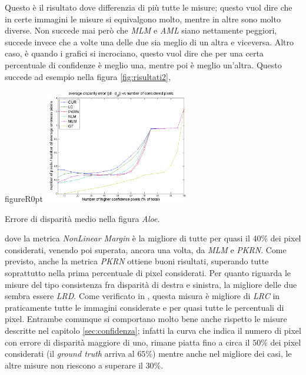 \documentclass[12pt]{report}
\begin{document}
			\noindent Questo è il risultato dove differenzia di più tutte le misure; questo vuol dire che in certe immagini le misure si equivalgono molto, mentre in altre sono molto diverse. Non succede mai però che \textit{MLM} e \textit{AML} siano nettamente peggiori, succede invece che a volte una delle due sia meglio di un altra e viceversa. Altro caso, è quando i grafici si incrociano, questo vuol dire che per una certa percentuale di confidenze è meglio una, mentre poi è meglio un'altra. Questo succede ad esempio nella figura \ref{fig:risultati2},
			\newpage
			
			\begin{wrapfloat}{figure}{R}{0pt}
				\includegraphics[width=0.48\textwidth]{./figures/result3.png}
				\caption{Errore di disparità medio nella figura \textit{Aloe}.}
				\label{fig:risultati2}
			\end{wrapfloat}
			
			\noindent dove la metrica \textit{NonLinear Margin} è la migliore di tutte per quasi il 40\% dei pixel considerati, venendo poi superata, ancora una volta, da \textit{MLM} e \textit{PKRN}. Come previsto, anche la metrica \textit{PKRN} ottiene buoni risultati, superando tutte soprattutto nella prima percentuale di pixel considerati. Per quanto riguarda le misure del tipo consistenza fra disparità di destra e sinistra, la migliore delle due sembra essere \textit{LRD}. Come verificato in \cite{mordohai_pami}, questa misura è migliore di \textit{LRC} in praticamente tutte le immagini considerate e per quasi tutte le percentuali di pixel. Entrambe comunque si comportano molto bene anche rispetto le misure descritte nel capitolo \ref{sec:confidenza}; infatti la curva che indica il numero di pixel con errore di disparità maggiore di uno, rimane piatta fino a circa il $50\%$ dei pixel considerati (il \textit{ground truth} arriva al $65\%$) mentre anche nel migliore dei casi, le altre misure non riescono a superare il $30\%$.
			
	
\end{document}
